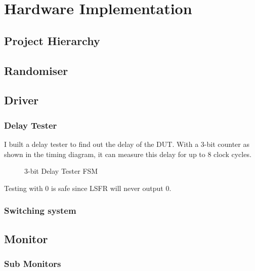 \section{Hardware Implementation}

\subsection{Project Hierarchy}

\subsection{Randomiser}

\subsection{Driver}

\subsubsection{Delay Tester}

I built a delay tester to find out the delay of the DUT.
With a 3-bit counter as shown in the timing diagram, it can measure this delay for up to 8 clock cycles.

\begin{figure}[ht]
  \centering
  
  \caption{3-bit Delay Tester FSM}
  \label{DelayTester}
\end{figure}
Testing with 0 is safe since LSFR will never output 0.

\subsubsection{Switching system}

\subsection{Monitor}
\subsubsection{Sub Monitors}

